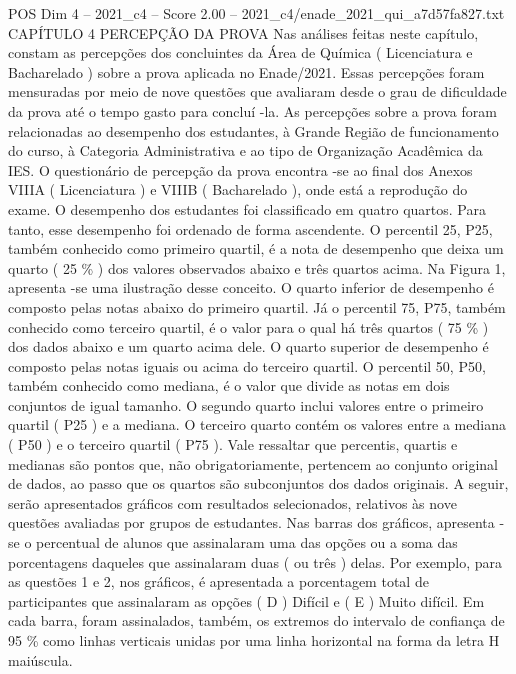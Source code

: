 \begin{textsample}{POS Dim 4 – 2021\_c4 – Score 2.00 – 2021\_c4/enade\_2021\_qui\_a7d57fa827.txt}  \label{ex:f4_pos_133}
CAPÍTULO 4 PERCEPÇÃO DA PROVA Nas análises feitas neste capítulo, constam as percepções dos concluintes da Área de Química ( Licenciatura e Bacharelado ) sobre a prova aplicada no Enade/2021.
Essas percepções foram mensuradas por meio de nove questões que avaliaram desde o grau de dificuldade da prova até o tempo gasto para concluí -la.
As percepções sobre a prova foram relacionadas ao desempenho dos estudantes, à Grande Região de funcionamento do curso, à Categoria Administrativa e ao tipo de Organização Acadêmica da IES.
O questionário de percepção da prova encontra -se ao final dos Anexos VIIIA ( Licenciatura ) e VIIIB ( Bacharelado ), onde está a reprodução do exame.
O desempenho dos estudantes foi classificado em quatro quartos.
Para tanto, esse desempenho foi ordenado de forma ascendente.
O percentil 25, P25, também conhecido como primeiro quartil, é a nota de desempenho que deixa um quarto ( 25 \% ) dos valores observados abaixo e três quartos acima.
Na Figura 1, apresenta -se uma ilustração desse conceito.
O quarto inferior de desempenho é composto pelas notas abaixo do primeiro quartil.
Já o percentil 75, P75, também conhecido como terceiro quartil, é o valor para o qual há três quartos ( 75 \% ) dos dados abaixo e um quarto acima dele.
O quarto superior de desempenho é composto pelas notas iguais ou acima do terceiro quartil.
O percentil 50, P50, também conhecido como mediana, é o valor que divide as notas em dois conjuntos de igual tamanho.
O segundo quarto inclui valores entre o primeiro quartil ( P25 ) e a mediana.
O terceiro quarto contém os valores entre a mediana ( P50 ) e o terceiro quartil ( P75 ).
Vale ressaltar que percentis, quartis e medianas são pontos que, não obrigatoriamente, pertencem ao conjunto original de dados, ao passo que os quartos são subconjuntos dos dados originais.
A seguir, serão apresentados gráficos com resultados selecionados, relativos às nove questões avaliadas por grupos de estudantes.
Nas barras dos gráficos, apresenta -se o percentual de alunos que assinalaram uma das opções ou a soma das porcentagens daqueles que assinalaram duas ( ou três ) delas.
Por exemplo, para as questões 1 e 2, nos gráficos, é apresentada a porcentagem total de participantes que assinalaram as opções ( D ) Difícil e ( E ) Muito difícil.
Em cada barra, foram assinalados, também, os extremos do intervalo de confiança de 95 \% como linhas verticais unidas por uma linha horizontal na forma da letra H maiúscula.

\end{textsample}
